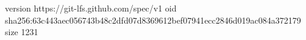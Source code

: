 version https://git-lfs.github.com/spec/v1
oid sha256:63c443aec056743b48c2dfd07d8369612bef07941ecc2846d019ac084a372179
size 1231
